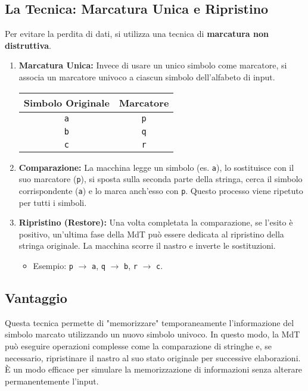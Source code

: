 \documentclass[a4paper]{article}
\theoremstyle{definition} %
\begin{document}
\subsection{La Tecnica: Marcatura Unica e Ripristino}
Per evitare la perdita di dati, si utilizza una tecnica di \textbf{marcatura non distruttiva}.
\begin{enumerate}
    \item \textbf{Marcatura Unica:} Invece di usare un unico simbolo come marcatore, si associa un marcatore univoco a ciascun simbolo dell'alfabeto di input.
    
    \begin{center}
    \begin{tabular}{|c|c|}
    \hline
    \textbf{Simbolo Originale} & \textbf{Marcatore} \\
    \hline
    \texttt{a} & \texttt{p} \\
    \texttt{b} & \texttt{q} \\
    \texttt{c} & \texttt{r} \\
    \hline
    \end{tabular}
    \end{center}
    \item \textbf{Comparazione:} La macchina legge un simbolo (es. \texttt{a}), lo sostituisce con il suo marcatore (\texttt{p}), si sposta sulla seconda parte della stringa, cerca il simbolo corrispondente (\texttt{a}) e lo marca anch'esso con \texttt{p}. Questo processo viene ripetuto per tutti i simboli.
    \item \textbf{Ripristino (Restore):} Una volta completata la comparazione, se l'esito è positivo, un'ultima fase della MdT può essere dedicata al ripristino della stringa originale. La macchina scorre il nastro e inverte le sostituzioni.
    \begin{itemize}
        \item Esempio: \texttt{p} $\rightarrow$ \texttt{a}, \texttt{q} $\rightarrow$ \texttt{b}, \texttt{r} $\rightarrow$ \texttt{c}.
    \end{itemize}
\end{enumerate}

\subsection{Vantaggio}
Questa tecnica permette di "memorizzare" temporaneamente l'informazione del simbolo marcato utilizzando un nuovo simbolo univoco. In questo modo, la MdT può eseguire operazioni complesse come la comparazione di stringhe e, se necessario, ripristinare il nastro al suo stato originale per successive elaborazioni. È un modo efficace per simulare la memorizzazione di informazioni senza alterare permanentemente l'input.
\end{document}
